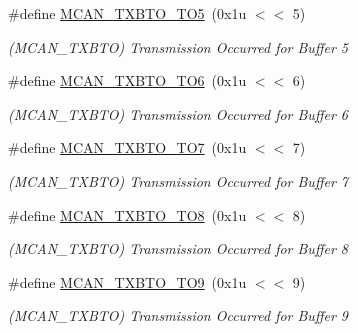 \begin{DoxyCompactItemize}
\mbox{\label{group__SAME70__MCAN_gaf335a10b97d8bb1bad5d0e5e3698e299}} 
\#define \mbox{\hyperlink{group__SAME70__MCAN_gaf335a10b97d8bb1bad5d0e5e3698e299}{M\+C\+A\+N\+\_\+\+T\+X\+B\+T\+O\+\_\+\+T\+O5}}~(0x1u $<$$<$ 5)
\begin{DoxyCompactList}\small\item\em (M\+C\+A\+N\+\_\+\+T\+X\+B\+TO) Transmission Occurred for Buffer 5 \end{DoxyCompactList}\item 
\mbox{\label{group__SAME70__MCAN_gabe09ca151513e62b3fe0a1352d4cdb4f}} 
\#define \mbox{\hyperlink{group__SAME70__MCAN_gabe09ca151513e62b3fe0a1352d4cdb4f}{M\+C\+A\+N\+\_\+\+T\+X\+B\+T\+O\+\_\+\+T\+O6}}~(0x1u $<$$<$ 6)
\begin{DoxyCompactList}\small\item\em (M\+C\+A\+N\+\_\+\+T\+X\+B\+TO) Transmission Occurred for Buffer 6 \end{DoxyCompactList}\item 
\mbox{\label{group__SAME70__MCAN_ga22753049ee3478ea07ed6cea17c87f91}} 
\#define \mbox{\hyperlink{group__SAME70__MCAN_ga22753049ee3478ea07ed6cea17c87f91}{M\+C\+A\+N\+\_\+\+T\+X\+B\+T\+O\+\_\+\+T\+O7}}~(0x1u $<$$<$ 7)
\begin{DoxyCompactList}\small\item\em (M\+C\+A\+N\+\_\+\+T\+X\+B\+TO) Transmission Occurred for Buffer 7 \end{DoxyCompactList}\item 
\mbox{\label{group__SAME70__MCAN_ga134a60b4d2b2c6ccb4c52076034c6c9a}} 
\#define \mbox{\hyperlink{group__SAME70__MCAN_ga134a60b4d2b2c6ccb4c52076034c6c9a}{M\+C\+A\+N\+\_\+\+T\+X\+B\+T\+O\+\_\+\+T\+O8}}~(0x1u $<$$<$ 8)
\begin{DoxyCompactList}\small\item\em (M\+C\+A\+N\+\_\+\+T\+X\+B\+TO) Transmission Occurred for Buffer 8 \end{DoxyCompactList}\item 
\mbox{\label{group__SAME70__MCAN_ga40504a0fc0593e73de0e72d25fa48f5b}} 
\#define \mbox{\hyperlink{group__SAME70__MCAN_ga40504a0fc0593e73de0e72d25fa48f5b}{M\+C\+A\+N\+\_\+\+T\+X\+B\+T\+O\+\_\+\+T\+O9}}~(0x1u $<$$<$ 9)
\begin{DoxyCompactList}\small\item\em (M\+C\+A\+N\+\_\+\+T\+X\+B\+TO) Transmission Occurred for Buffer 9 \end{DoxyCompactList}\item 
$$
\end{DoxyCompactItemize}

